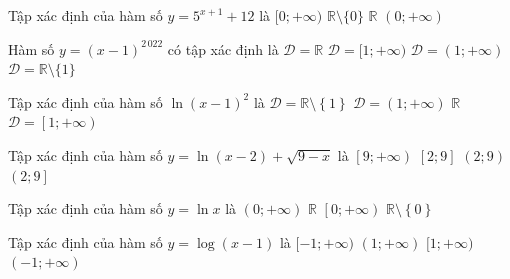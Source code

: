 \begin{ex}%
	 Tập xác định của hàm số $y=5^{x+1}+12$ là
	\choice 
		{$[0;+\infty)$} 
		{$\mathbb{R}\setminus  \{0\}$}
		 {\True $\mathbb{R}$}
		{$(0;+\infty)$} 
\end{ex}

\begin{ex}%
	 Hàm số $y=(x-1)^{2\,022}$ có tập xác định là
	 \choice
		{\True  $\mathscr{D}=\mathbb{R}$}
		 {$ \mathscr{D}=[1;+\infty)$}
		{$ \mathscr{D}=(1;+\infty)$} 
		{$\mathscr{D}=\mathbb{R}\setminus \{1\}$} 
\end{ex}

\begin{ex}%
	 Tập xác định của hàm số $\ln{(x-1)^2}$ là
	 \choice
		{\True  $\mathscr{D}=\mathbb{R}\setminus \left\{1\right\}$}
		{$\mathscr{D}=(1;+\infty)$} 
		{$\mathbb{R}$} 
		 {$\mathscr{D}=\left[1;+\infty\right)$}
\end{ex}

\begin{ex}%
	Tập xác  định của hàm số $y=\ln (x-2)+\sqrt{9-x}$ là
	\choice 
		 {$\left[9;+\infty\right)$}
		 {$\left[2;9\right]$}
		{$(2;9)$} 
		{\True $\left(2;9\right]$} 
	\loigiai{ 
		Ta có điều kiện xác định  của hàm số
		$\heva{&x-2>0 \\&9-x\ge 0} 
		\Leftrightarrow  x\in \left(2;9\right]$.
	 }
\end{ex}

\begin{ex}%
	Tập xác  định của hàm số $y=\ln x$ là
	\choice 
		{\True  $(0;+\infty)$}
		{$\mathbb{R}$} 
		{$\left[0;+\infty\right)$} 
		{$\mathbb{R}\setminus \left\{0\right\}$} 
\end{ex}

\begin{ex}%
	Tập xác định của hàm  số $y=\log (x-1)$ là
	\choice 
		{$[-1;+\infty)$} 
		{\True  $(1;+\infty)$}
		{$[1;+\infty)$} 
		{$(-1;+\infty)$} 
\end{ex}

